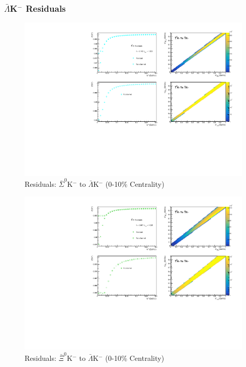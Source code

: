 \documentclass[../AnalysisNoteJBuxton.tex]{subfiles}
\begin{document}
\subsubsection{\texorpdfstring{$\bar{\Lambda}$K$^{-}$}{TEXT} Residuals}
\label{Residuals_ALamKchM}

\begin{figure}[h]
  \centering
  \includegraphics[width=\textwidth]{9_AdditionalFigures/Figures/Residuals/ALamKchM/Residuals_ALamKchM_0010_ASig0KchM_MomResCrctn_NonFlatBgdCrctn_10Res_PrimMaxDecay4fm_UsingXiDataAndCoulombOnly.pdf}
  \caption[Residuals: $\bar{\Sigma}^{0}$K$^{-}$ to $\bar{\Lambda}$K$^{-}$ (0-10\% Centrality)]{Residuals: $\bar{\Sigma}^{0}$K$^{-}$ to $\bar{\Lambda}$K$^{-}$ (0-10\% Centrality)}
  \label{fig:Res_ALamKchM_0010_ASig0KchM}
\end{figure}

\begin{figure}[h]
  \centering
  \includegraphics[width=\textwidth]{9_AdditionalFigures/Figures/Residuals/ALamKchM/Residuals_ALamKchM_0010_AXi0KchM_MomResCrctn_NonFlatBgdCrctn_10Res_PrimMaxDecay4fm_UsingXiDataAndCoulombOnly.pdf}
  \caption[Residuals: $\bar{\Xi}^{0}$K$^{-}$ to $\bar{\Lambda}$K$^{-}$ (0-10\% Centrality)]{Residuals: $\bar{\Xi}^{0}$K$^{-}$ to $\bar{\Lambda}$K$^{-}$ (0-10\% Centrality)}
  \label{fig:Res_ALamKchM_0010_AXi0KchM}
\end{figure}
\end{document}
